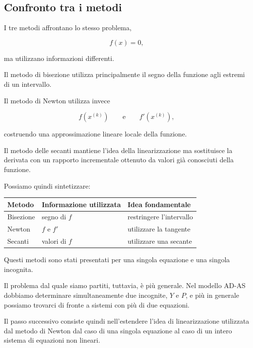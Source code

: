 \subsection{Confronto tra i metodi}

I tre metodi affrontano lo stesso problema,

\begin{equation*}
    f(x)=0,
\end{equation*}

ma utilizzano informazioni differenti.

Il metodo di bisezione utilizza principalmente il segno della
funzione agli estremi di un intervallo.

Il metodo di Newton utilizza invece

\begin{equation*}
    f(x^{(k)})
    \qquad\text{e}\qquad
    f'(x^{(k)}),
\end{equation*}

costruendo una approssimazione lineare locale della funzione.

Il metodo delle secanti mantiene l'idea della linearizzazione ma
sostituisce la derivata con un rapporto incrementale ottenuto da
valori già conosciuti della funzione.

Possiamo quindi sintetizzare:

\begin{center}
\begin{tabular}{lll}
\hline
Metodo & Informazione utilizzata & Idea fondamentale\\
\hline
Bisezione &
segno di $f$ &
restringere l'intervallo\\
Newton &
$f$ e $f'$ &
utilizzare la tangente\\
Secanti &
valori di $f$ &
utilizzare una secante\\
\hline
\end{tabular}
\end{center}

Questi metodi sono stati presentati per una singola equazione e
una singola incognita.

Il problema dal quale siamo partiti, tuttavia, è più generale.
Nel modello AD-AS dobbiamo determinare simultaneamente due
incognite, $Y$ e $P$, e più in generale possiamo trovarci di fronte
a sistemi con più di due equazioni.

Il passo successivo consiste quindi nell'estendere l'idea di
linearizzazione utilizzata dal metodo di Newton dal caso di una
singola equazione al caso di un intero sistema di equazioni non
lineari.

